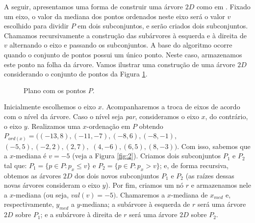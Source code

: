 A seguir, apresentamos uma forma de construir uma árvore $2D$ como em \cite{cg08}.
Fixado um eixo, o valor da mediana dos pontos ordenados neste eixo será o valor $v$ escolhido para dividir $P$ em dois subconjuntos, e serão criados dois subconjuntos. Chamamos recursivamente a construção das subárvores à esquerda e à direita de $v$ alternando o eixo e passando os subconjuntos. A base do algoritmo ocorre quando o conjunto de pontos possui um único ponto. Neste caso, armazenamos este ponto na folha da árvore.  Vamos ilustrar uma construção de uma árvore $2D$ considerando o conjunto de pontos da Figura \ref{fig:1}.
\begin{figure}[h!]
    \centering
    \caption{Plano com os pontos $P$.}
    \label{fig:1}
\end{figure}

Inicialmente escolhemos o eixo $x$. Acompanharemos a troca de eixos de acordo com o nível da árvore. Caso o nível seja \emph{par}, consideramos o eixo $x$, do contrário, o eixo $y$.
Realizamos uma $x$-ordenação em $P$ obtendo $P_{ord(x)} = ((-13,8), (-11,-7), (-8,6), (-8,-1),$ $(-5,5), (-2, 2), (2,7),$ $ (4,-6),(6,5),(8,-3))$. Com isso, sabemos que a $x$-mediana é $v = -5$ (veja a Figura \ref{fig:2}). Criamos dois subconjuntos $P_1$ e $P_2$ tal que: $P_1 = \{p \in P : p_x \leq v\}$ e $P_2 = \{p \in P : p_x > v\}$; e, de forma recursiva, obtemos as árvores $2D$ dos dois novos subconjuntos $P_1$ e $P_2$ (as raízes dessas novas árvores consideram o eixo $y$). Por fim, criamos um nó $r$ e armazenamos nele a $x$-mediana (ou seja, $val(v)=-5)$. Chamaremos a $x$-mediana de $x_{med}$ e, respectivamente, $y_{med}$ a $y$-mediana; a subárvore à esquerda de $r$ será uma árvore $2D$ sobre $P_1$; e a subárvore à direita de $r$ será uma árvore $2D$ sobre $P_2$. %

